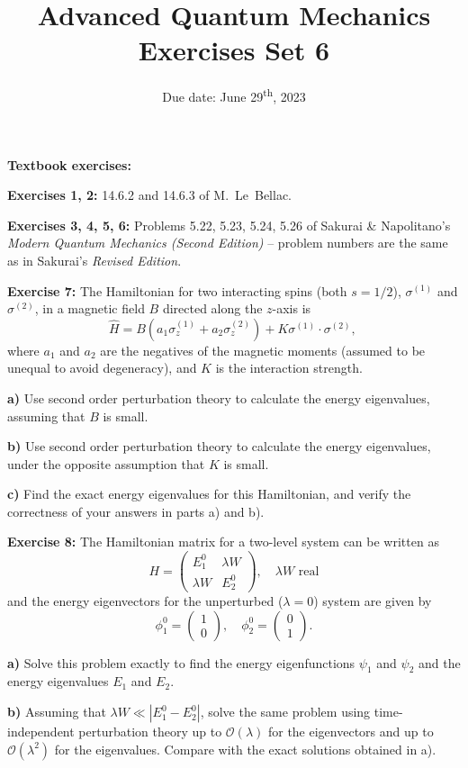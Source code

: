 \documentclass[12pt]{article}
\title{Advanced Quantum Mechanics\\Exercises Set 6\vspace{-1em}}
\date{Due date: June 29\textsuperscript{th}, 2023}
\begin{document}
\maketitle

\textbf{Textbook exercises:}

\textbf{Exercises 1, 2:} 14.6.2 and 14.6.3 of M.~Le~Bellac.

\textbf{Exercises 3, 4, 5, 6:} Problems 5.22, 5.23, 5.24, 5.26 of Sakurai \& Napolitano's \emph{Modern Quantum Mechanics (Second Edition)} -- problem numbers are the same as in Sakurai's \emph{Revised Edition}.

\textbf{Exercise 7:} The Hamiltonian for two interacting spins
(both $s=1 / 2$), $\sigma^{(1)}$ and $\sigma^{(2)}$, in a magnetic field $B$ directed along the $z$-axis is
\[
\hat{H}=B\left(a_{1} \sigma_{z}^{(1)}+a_{2} \sigma_{z}^{(2)}\right)+K \sigma^{(1)} \cdot \sigma^{(2)} \text {, }
\]
where $a_{1}$ and $a_{2}$ are the negatives of the magnetic moments (assumed to be unequal to avoid
degeneracy), and $K$ is the interaction strength.

\textbf{a)} Use second order perturbation theory to calculate the energy eigenvalues, assuming that
$B$ is small.

\textbf{b)} Use second order perturbation theory to calculate the energy eigenvalues, under the opposite assumption that $K$ is small.

\textbf{c)} Find the exact energy eigenvalues for this Hamiltonian, and verify the correctness of your
answers in parts a) and b).

\textbf{Exercise 8:} The Hamiltonian matrix
for a two-level system can be written as
\[
H=\begin{pmatrix}E_{1}^{0} & \lambda W \\ \lambda W & E_{2}^{0}\end{pmatrix},
\quad \lambda W\text{ real}
\]
and the energy eigenvectors for the unperturbed ($\lambda=0$) system are given by
\[
\phi_{1}^{0}=\begin{pmatrix}1 \\ 0\end{pmatrix}, \quad \phi_{2}^{0}=\begin{pmatrix}0 \\ 1\end{pmatrix}.
\]

\textbf{a)} Solve this problem exactly to find the energy eigenfunctions $\psi_{1}$ and $\psi_{2}$ and the energy
eigenvalues $E_{1}$ and $E_{2}$.

\textbf{b)} Assuming that $\lambda W \ll\left|E_{1}^{0}-E_{2}^{0}\right|$, solve the same problem using time-independent perturbation theory up to $\mathcal{O}(\lambda)$ for the eigenvectors and up to $\mathcal{O}\left(\lambda^{2}\right)$ for the eigenvalues. Compare
with the exact solutions obtained in a).
\end{document}
